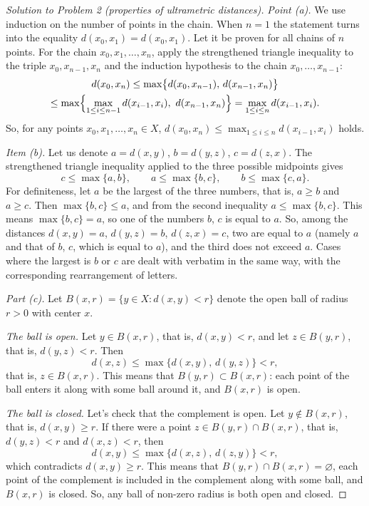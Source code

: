 \documentclass[a4paper,12pt]{report}
\begin{document}
\begin{proof}[Solution to Problem \textup{2} \textup{(}properties of ultrametric distances\textup{)}]
\textit{Point \textup{(a)}.} We use induction on the number of points in the chain. When $n=1$ the statement turns into the equality $d(x_0,x_1)=d(x_0,x_1)$. Let it be proven for all chains of $n$ points. For the chain $x_0,x_1,\dots,x_n$, apply the strengthened triangle inequality to the triple $x_0,x_{n-1},x_n$ and the induction hypothesis to the chain $x_0,\dots,x_{n-1}$\textup{:}
\[
\begin{gathered}
d(x_0,x_n)\le\max\bigl\{d(x_0,x_{n-1}),\,d(x_{n-1},x_n)\bigr\}\\
\le\max\Bigl\{\max_{1\le i\le n-1}d(x_{i-1},x_i),\ d(x_{n-1},x_n)\Bigr\}=\max_{1\le i\le n}d(x_{i-1},x_i) .
\end{gathered}
\]
So, for any points $x_0,x_1,\dots,x_n\in X$, $d(x_0,x_n)\le\max_{1\le i\le n}d(x_{i-1},x_i)$ holds.

\textit{Item \textup{(b)}.} Let us denote $a=d(x,y)$, $b=d(y,z)$, $c=d(z,x)$. The strengthened triangle inequality applied to the three possible midpoints gives
\[
c\le\max\{a,b\},\qquad a\le\max\{b,c\},\qquad b\le\max\{c,a\} .
\]
For definiteness, let $a$ be the largest of the three numbers, that is, $a\ge b$ and $a\ge c$. Then $\max\{b,c\}\le a$, and from the second inequality $a\le\max\{b,c\}$. This means $\max\{b,c\}=a$, so one of the numbers $b$, $c$ is equal to $a$. So, among the distances $d(x,y)=a$, $d(y,z)=b$, $d(z,x)=c$, two are equal to $a$ \textup{(}namely $a$ and that of $b$, $c$, which is equal to $a$\textup{)}, and the third does not exceed $a$. Cases where the largest is $b$ or $c$ are dealt with verbatim in the same way, with the corresponding rearrangement of letters.

\textit{Part \textup{(c)}.} Let $B(x,r)=\{y\in X:d(x,y)<r\}$ denote the open ball of radius $r>0$ with center $x$.

\textit{The ball is open.} Let $y\in B(x,r)$, that is, $d(x,y)<r$, and let $z\in B(y,r)$, that is, $d(y,z)<r$. Then
\[
d(x,z)\le\max\bigl\{d(x,y),\,d(y,z)\bigr\}<r ,
\]
that is, $z\in B(x,r)$. This means that $B(y,r)\subset B(x,r)$\textup{:} each point of the ball enters it along with some ball around it, and $B(x,r)$ is open.

\textit{The ball is closed.} Let's check that the complement is open. Let $y\notin B(x,r)$, that is, $d(x,y)\ge r$. If there were a point $z\in B(y,r)\cap B(x,r)$, that is, $d(y,z)<r$ and $d(x,z)<r$, then
\[
d(x,y)\le\max\bigl\{d(x,z),\,d(z,y)\bigr\}<r ,
\]
which contradicts $d(x,y)\ge r$. This means that $B(y,r)\cap B(x,r)=\varnothing$, each point of the complement is included in the complement along with some ball, and $B(x,r)$ is closed. So, any ball of non-zero radius is both open and closed.


\end{proof}
\end{document}
